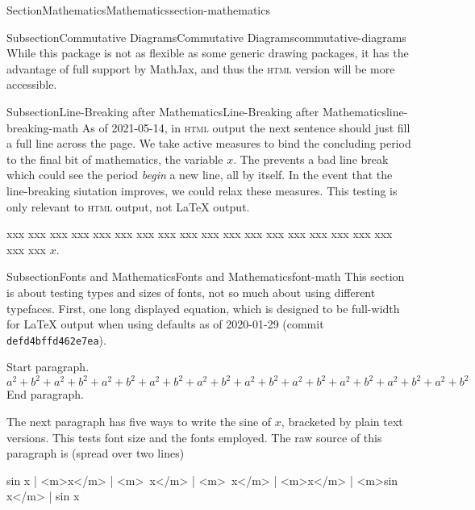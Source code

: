 \documentclass[twoside,10pt,]{article}
\newcommand{\mono}[1]{\texttt{#1}}
\newcommand{\initialism}[1]{\textsc{\MakeLowercase{#1}}}
\numberwithin{equation}{section}
\begin{document}
\begin{sectionptx}{Section}{Mathematics}{}{Mathematics}{}{}{section-mathematics}
\begin{subsectionptx}{Subsection}{Commutative Diagrams}{}{Commutative Diagrams}{}{}{commutative-diagrams}
\begin{equation*}
\end{equation*}
While this package is not as flexible as some generic drawing packages, it has the advantage of full support by MathJax, and thus the \initialism{HTML} version will be more accessible.%
\end{subsectionptx}
%
%
\typeout{************************************************}
\typeout{************************************************}
%
\begin{subsectionptx}{Subsection}{Line-Breaking after Mathematics}{}{Line-Breaking after Mathematics}{}{}{line-breaking-math}
As of 2021-05-14, in \initialism{HTML} output the next sentence should just fill a full line across the page.  We take active measures to bind the concluding period to the final bit of mathematics, the variable \(x\).  The prevents a bad line break which could see the period \emph{begin} a new line, all by itself.  In the event that the line-breaking siutation improves, we could relax these measures.  This testing is only relevant to \initialism{HTML} output, not \LaTeX{} output.%
\par
xxx xxx xxx xxx xxx xxx xxx xxx xxx xxx xxx xxx xxx xxx xxx xxx xxx xxx xxx xxx \(x\).%
\end{subsectionptx}
%
%
\typeout{************************************************}
\typeout{************************************************}
%
\begin{subsectionptx}{Subsection}{Fonts and Mathematics}{}{Fonts and Mathematics}{}{}{font-math}
This section is about testing types and sizes of fonts, not so much about using different typefaces.  First, one long displayed equation, which is designed to be full-width for \LaTeX{} output when using defaults as of 2020-01-29 (commit \mono{defd4bffd462e7ea}).%
\par
Start paragraph.%
\begin{equation*}
a^2 + b^2 + a^2 + b^2 + a^2 + b^2 + a^2 + b^2 + a^2 + b^2 + a^2 + b^2 + a^2 + b^2 + a^2 + b^2 + a^2 + b^2 + a^2 + b^2
\end{equation*}
End paragraph.%
\par
The next paragraph has five ways to write the sine of \(x\), bracketed by plain text versions.  This tests font size and the fonts employed.  The raw source of this paragraph is (spread over two lines)%
\begin{codedisplay}
sin x | <m>\sin x</m> | <m>\ x</m> | <m>\ x</m> |
<m>x</m> | <m>sin x</m> | sin x

\end{codedisplay}
\end{subsectionptx}
\end{sectionptx}
\end{document}

